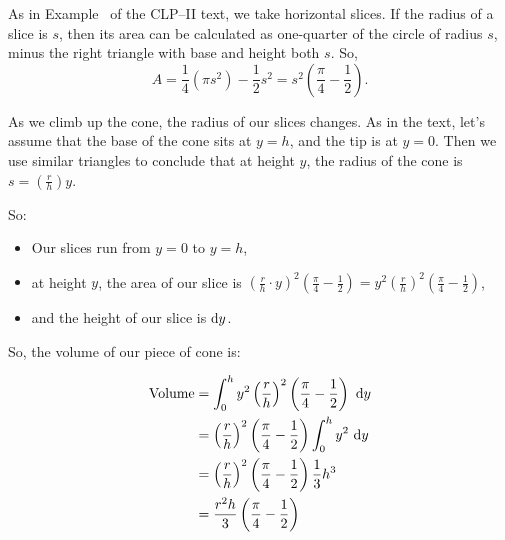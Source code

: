 \begin{solution}
As in Example~ of the CLP--II text, we take horizontal slices. If the radius of a slice is $s$, then its area can be calculated as one-quarter of the circle of radius $s$, minus the right triangle with base and height both $s$. So, \[A = \frac{1}{4}\left(\pi s^2\right) - \frac{1}{2} s^2 = s^2\left(\frac{\pi}{4}-\frac{1}{2}\right).\]

As we climb up the cone, the radius of our slices changes. As in the text, let's assume that the base of the cone sits at $y=h$, and the tip is at $y=0$. Then we use similar triangles to conclude that at height $y$, the radius of the cone is $s=\left(\frac{r}{h}\right)y$.

\begin{center}
\end{center}

So:
\begin{itemize}
\item Our slices run from $y=0$ to $y=h$,
\item at height $y$, the area of our slice is $\left(\frac{r}{h}\cdot y\right)^2\left(\frac{\pi}{4}-\frac{1}{2}\right) = y^2\left(\frac{r}{h}\right)^2\left(\frac{\pi}{4}-\frac{1}{2}\right)$,
\item and the height of our slice is $\mathrm{d}y$.
\end{itemize}
\item So, the volume of our piece of cone is:

\begin{align*}
\mbox{Volume}&=\int_0^h y^2\left(\frac{r}{h}\right)^2\left(\frac{\pi}{4}-\frac{1}{2}\right)\ \dee{y}\\
&=\left(\frac{r}{h}\right)^2\left(\frac{\pi}{4}-\frac{1}{2}\right)\int_0^h y^2\ \dee{y}
\\&=
\left(\frac{r}{h}\right)^2\left(\frac{\pi}{4}-\frac{1}{2}\right)\frac{1}{3}h^3\\
&= \frac{r^2h}{3}\left(\frac{\pi}{4}-\frac{1}{2}\right)
\end{align*}
\end{solution}


